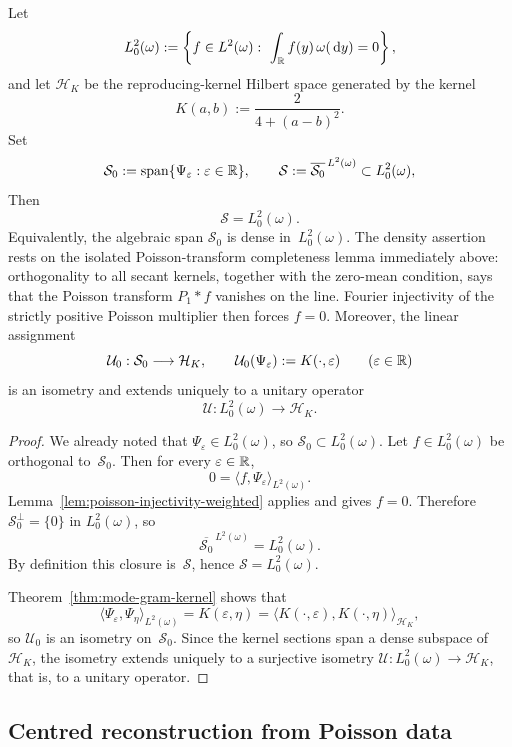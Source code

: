 \begin{theorem}%
\label{thm:mode-space-rkhs}
Let
\[
L^2_0(\omega):=
\left\{
f\in L^2(\omega):\ \int_{\mathbb{R}}f(y)\,\omega(\,\mathrm{d} y)=0
\right\},
\]
and let $\mathcal H_K$ be the reproducing-kernel Hilbert space generated
by the kernel
\[
K(a,b):=\frac{2}{4+(a-b)^2}.
\]
Set
\[
\mathcal S_0:=\operatorname{span}\{\Psi_\varepsilon:\varepsilon\in\mathbb{R}\},
\qquad
\mathcal S:=\overline{\mathcal S_0}^{\,L^2(\omega)}
\subset L^2_0(\omega),
\]
Then
\[
\mathcal S=L^2_0(\omega).
\]
Equivalently, the algebraic span
$\mathcal S_0$ is dense in~$L^2_0(\omega)$.
The density assertion rests on the isolated Poisson-transform completeness
lemma immediately above: orthogonality to all secant kernels, together with
the zero-mean condition, says that the Poisson transform \(P_1*f\) vanishes
on the line.  Fourier injectivity of the strictly positive Poisson multiplier
then forces \(f=0\).
Moreover, the linear assignment
\[
\mathcal U_0:\mathcal S_0\longrightarrow \mathcal H_K,
\qquad
\mathcal U_0(\Psi_\varepsilon):=K(\cdot,\varepsilon)
\qquad(\varepsilon\in\mathbb{R})
\]
is an isometry and extends uniquely to a unitary operator
\[
\mathcal U:L^2_0(\omega)\longrightarrow \mathcal H_K.
\]
\end{theorem}

\begin{proof}
We already noted that $\Psi_\varepsilon\in L^2_0(\omega)$, so
$\mathcal S_0\subset L^2_0(\omega)$.  Let
$f\in L^2_0(\omega)$ be orthogonal to~$\mathcal S_0$.  Then for every
$\varepsilon\in\mathbb{R}$,
\[
0=\langle f,\Psi_\varepsilon\rangle_{L^2(\omega)}.
\]
Lemma~\ref{lem:poisson-injectivity-weighted} applies and gives $f=0$.
Therefore $\mathcal S_0^\perp=\{0\}$ in $L^2_0(\omega)$, so
\[
\overline{\mathcal S_0}^{\,L^2(\omega)}=L^2_0(\omega).
\]
By definition this closure is~$\mathcal S$, hence
$\mathcal S=L^2_0(\omega)$.

Theorem~\ref{thm:mode-gram-kernel} shows that
\[
\langle \Psi_\varepsilon,\Psi_\eta\rangle_{L^2(\omega)}
=K(\varepsilon,\eta)
=\langle K(\cdot,\varepsilon),K(\cdot,\eta)\rangle_{\mathcal H_K},
\]
so $\mathcal U_0$ is an isometry on~$\mathcal S_0$.  Since the
kernel sections span a dense subspace of~$\mathcal H_K$, the isometry
extends uniquely to a surjective isometry
$\mathcal U:L^2_0(\omega)\to\mathcal H_K$, that is, to a unitary
operator.
\end{proof}

\subsection{Centred reconstruction from Poisson data}

